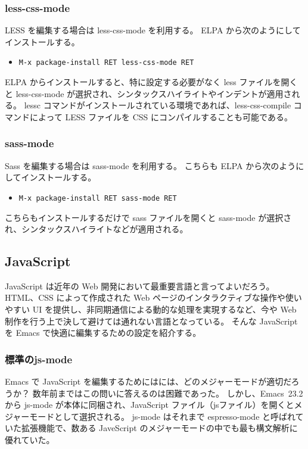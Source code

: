 \subsubsection{less-css-mode}
LESS を編集する場合は less-css-mode を利用する。
ELPA から次のようにしてインストールする。
\begin{itemize}\setlength{\leftskip}{-1.00zw}%
\item[] \texttt{M-x package-install RET less-css-mode RET}
\end{itemize}
ELPA からインストールすると、特に設定する必要がなく less ファイルを開くと less-css-mode が選択され、シンタックスハイライトやインデントが適用される。
lessc コマンドがインストールされている環境であれば、less-css-compile コマンドによって LESS ファイルを CSS にコンパイルすることも可能である。
\subsubsection{sass-mode}
Sass を編集する場合は sass-mode を利用する。
こちらも ELPA から次のようにしてインストールする。
\begin{itemize}\setlength{\leftskip}{-1.00zw}%
\item[] \texttt{M-x package-install RET sass-mode RET}
\end{itemize}
こちらもインストールするだけで sass ファイルを開くと sass-mode が選択され、シンタックスハイライトなどが適用される。
\subsection{JavaScript}
JavaScript は近年の Web 開発において最重要言語と言ってよいだろう。
HTML、CSS によって作成された Web ページのインタラクティブな操作や使いやすい UI を提供し、非同期通信による動的な処理を実現するなど、今や Web 制作を行う上で決して避けては通れない言語となっている。
そんな JavaScript を Emacs で快適に編集するための設定を紹介する。
\subsubsection{標準のjs-mode}
Emacs で JavaScript を編集するためにはには、どのメジャーモードが適切だろうか？
数年前まではこの問いに答えるのは困難であった。\enlargethispage{1.00zw}
しかし、Emacs~23.2 から js-mode が本体に同梱され、JavaScript ファイル（jsファイル）を開くとメジャーモードとして選択される。
js-mode はそれまで espresso-mode と呼ばれていた拡張機能で、数ある JaveScript のメジャーモードの中でも最も構文解析に優れていた。\\

